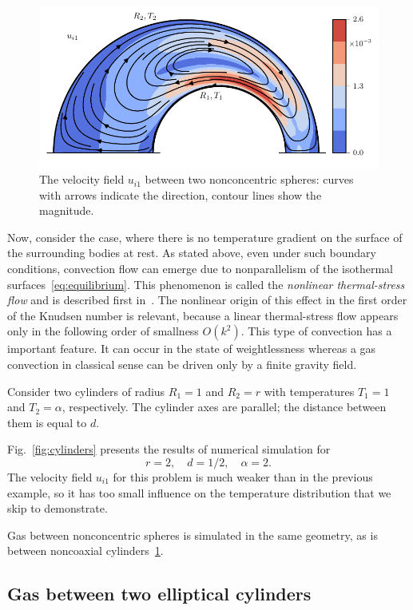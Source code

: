 \documentclass[smallextended, referee]{svjour3} %
\begin{document}
\begin{figure}
	\centering
	\includegraphics{Fig8}
	\caption{The velocity field \(u_{i1}\) between two nonconcentric spheres:
		curves with arrows indicate the direction, contour lines show the magnitude.}
	\label{fig:spheres}
\end{figure}

Now, consider the case, where there is no temperature gradient on the surface of the surrounding bodies at rest.
As stated above, even under such boundary conditions, convection flow can emerge
due to nonparallelism of the isothermal surfaces~\eqref{eq:equilibrium}.
This phenomenon is called the \emph{nonlinear thermal-stress flow}
and is described first in~\cite{Kogan1971}.
The nonlinear origin of this effect in the first order of the Knudsen number is relevant,
because a linear thermal-stress flow appears only in the following order of smallness \(O(k^2)\).
This type of convection has a important feature. It can occur in the state of weightlessness
whereas a gas convection in classical sense can be driven only by a finite gravity field.

Consider two cylinders of radius \(R_1 = 1\) and \(R_2 = r\)
with temperatures \(T_1 = 1\) and \(T_2 = \alpha\), respectively.
The cylinder axes are parallel; the distance between them is equal to \(d\).

Fig.~\ref{fig:cylinders} presents the results of numerical simulation for
\[ r = 2, \quad d = 1/2, \quad \alpha = 2. \]
The velocity field \(u_{i1}\) for this problem is much weaker than in the previous example,
so it has too small influence on the temperature distribution that we skip to demonstrate.

Gas between nonconcentric spheres is simulated in the same geometry,
as is between noncoaxial cylinders~\ref{fig:spheres}.

\subsection{Gas between two elliptical cylinders}
\end{document}
